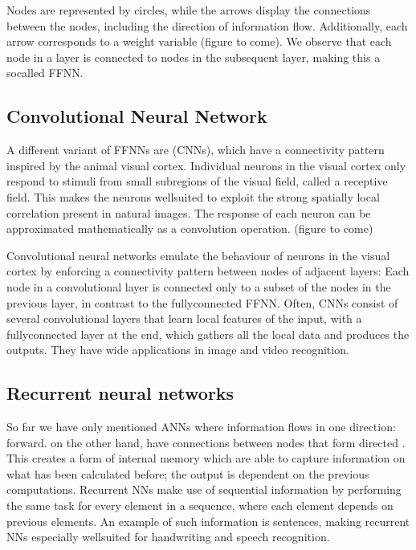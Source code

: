 \documentclass[letterpaper,10pt,english]{sphinxmanual}
\begin{document}
Nodes are represented by circles, while the arrows display the
connections between the nodes, including the direction of information
flow. Additionally, each arrow corresponds to a weight variable
(figure to come).  We observe that each node in a layer is connected
to  nodes in the subsequent layer, making this a so\sphinxhyphen{}called
 FFNN.


\subsection{Convolutional Neural Network}
\label{\detokenize{chapter6:convolutional-neural-network}}
A different variant of FFNNs are 
(CNNs), which have a connectivity pattern inspired by the animal
visual cortex. Individual neurons in the visual cortex only respond to
stimuli from small sub\sphinxhyphen{}regions of the visual field, called a receptive
field. This makes the neurons well\sphinxhyphen{}suited to exploit the strong
spatially local correlation present in natural images. The response of
each neuron can be approximated mathematically as a convolution
operation.  (figure to come)

Convolutional neural networks emulate the behaviour of neurons in the
visual cortex by enforcing a  connectivity pattern between
nodes of adjacent layers: Each node in a convolutional layer is
connected only to a subset of the nodes in the previous layer, in
contrast to the fully\sphinxhyphen{}connected FFNN.  Often, CNNs consist of several
convolutional layers that learn local features of the input, with a
fully\sphinxhyphen{}connected layer at the end, which gathers all the local data and
produces the outputs. They have wide applications in image and video
recognition.


\subsection{Recurrent neural networks}
\label{\detokenize{chapter6:recurrent-neural-networks}}
So far we have only mentioned ANNs where information flows in one
direction: forward.  on the other hand,
have connections between nodes that form directed . This
creates a form of internal memory which are able to capture
information on what has been calculated before; the output is
dependent on the previous computations. Recurrent NNs make use of
sequential information by performing the same task for every element
in a sequence, where each element depends on previous elements. An
example of such information is sentences, making recurrent NNs
especially well\sphinxhyphen{}suited for handwriting and speech recognition.
\end{document}
